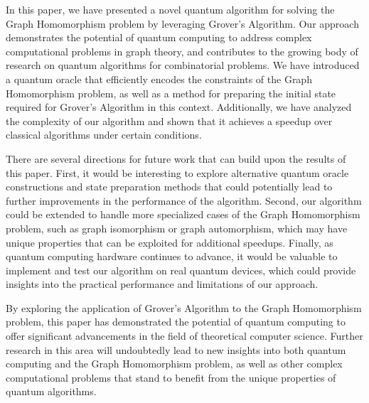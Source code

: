 In this paper, we have presented a novel quantum algorithm for solving the Graph Homomorphism problem by leveraging Grover's Algorithm. Our approach demonstrates the potential of quantum computing to address complex computational problems in graph theory, and contributes to the growing body of research on quantum algorithms for combinatorial problems. We have introduced a quantum oracle that efficiently encodes the constraints of the Graph Homomorphism problem, as well as a method for preparing the initial state required for Grover's Algorithm in this context. Additionally, we have analyzed the complexity of our algorithm and shown that it achieves a speedup over classical algorithms under certain conditions.

There are several directions for future work that can build upon the results of this paper. First, it would be interesting to explore alternative quantum oracle constructions and state preparation methods that could potentially lead to further improvements in the performance of the algorithm. Second, our algorithm could be extended to handle more specialized cases of the Graph Homomorphism problem, such as graph isomorphism or graph automorphism, which may have unique properties that can be exploited for additional speedups. Finally, as quantum computing hardware continues to advance, it would be valuable to implement and test our algorithm on real quantum devices, which could provide insights into the practical performance and limitations of our approach.

By exploring the application of Grover's Algorithm to the Graph Homomorphism problem, this paper has demonstrated the potential of quantum computing to offer significant advancements in the field of theoretical computer science. Further research in this area will undoubtedly lead to new insights into both quantum computing and the Graph Homomorphism problem, as well as other complex computational problems that stand to benefit from the unique properties of quantum algorithms.

